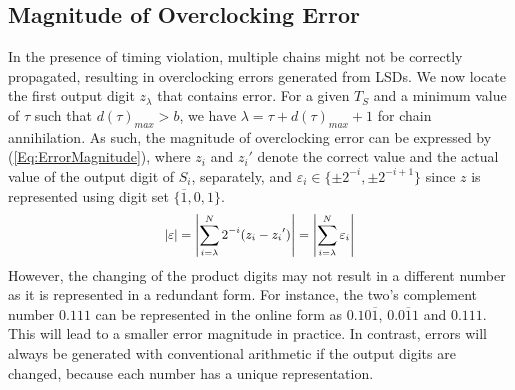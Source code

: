 \documentclass{acm_proc_article-sp}
\begin{document}
\subsection{Magnitude of Overclocking Error}
In the presence of timing violation, multiple chains might not be correctly propagated, resulting in overclocking errors generated from LSDs. We now locate the first output digit $z_{\lambda}$ that contains error. For a given $T_S$ and a minimum value of $\tau$ such that $d(\tau)_{max}>b$, we have $\lambda=\tau+d(\tau)_{max}+1$ for chain annihilation.
%
%
As such, the magnitude of overclocking error can be expressed by (\ref{Eq:ErrorMagnitude}), where $z_i$ and ${z_i}'$ denote the correct value and the actual value of the output digit of $S_i$, separately, and $\varepsilon_i\in\{\pm2^{-i},\pm2^{-i+1}\}$ since $z$ is represented using digit set $\{\overline{1},0,1\}$.
%
\begin{eqnarray}\label{Eq:ErrorMagnitude}
\scriptsize
  \left|\varepsilon\right|=\left|\sum_{i=\lambda}^{N}2^{-i}(z_i-{z_i}')\right|=\left|\sum_{i=\lambda}^{N} \varepsilon_i\right|
\normalsize
\end{eqnarray}
%
However, the changing of the product digits may not result in a different number as it is represented in a redundant form. For instance, the two's complement number $0.111$ can be represented in the online form as $0.10\overline{1}$, $0.0\overline{1}1$ and $0.111$. This will lead to a smaller error magnitude in practice. In contrast, errors will always be generated with conventional arithmetic if the output digits are changed, because each number has a unique representation.\vspace{-1ex}



\end{document}

